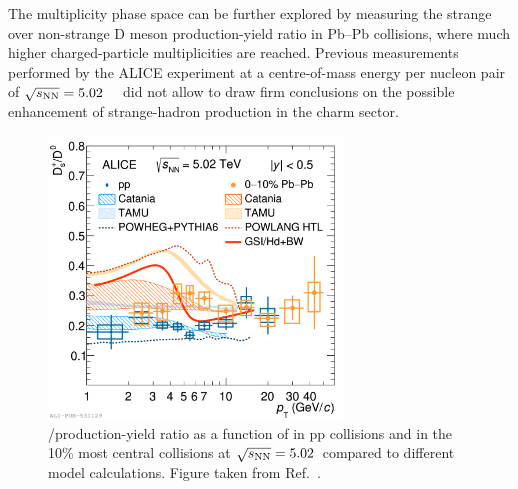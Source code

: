 \begin{sloppypar}
The multiplicity phase space can be further explored by measuring the strange over non-strange D meson production-yield ratio in Pb--Pb collisions, where much higher charged-particle multiplicities are reached. Previous measurements performed by the ALICE experiment at a centre-of-mass energy per nucleon pair of \mbox{$\sqrt{s_\mathrm{NN}}=5.02$~\tev~\cite{ALICE:2021kfc}} did not allow to draw firm conclusions on the possible enhancement of strange-hadron production in the charm sector. %
\end{sloppypar}


\begin{figure}[htb]
    \centering
    \includegraphics[width=0.7\textwidth]{Figures/Chapter 9/DsOverD0_pp_PbPb_5dot02TeV.png}
    \caption{\ds/\dz production-yield ratio as a function of \pt in pp collisions and in the 10\% most central \pbpb collisions at $\sqrt{s_\mathrm{NN}}=5.02$~\tev compared to different model calculations. Figure taken from Ref.~\cite{ALICE:2022wpn}.}
    \label{fig:Double_ratio}
\end{figure}

